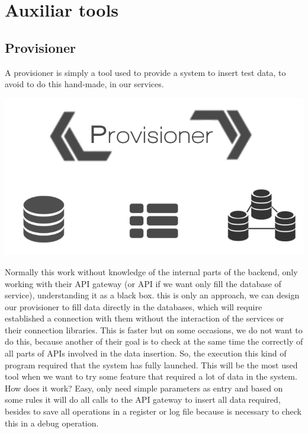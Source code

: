 \section{Auxiliar tools}


\subsection{Provisioner}
A provisioner is simply a tool used to provide a system to insert test data, to
avoid to do this hand-made, in our services.

\begin{center}
\includegraphics[scale=0.4]{img/graphics/provisioner.png}
\end{center}

\noindent Normally this work without knowledge
of the internal parts of the backend, only working with their API gateway (or
API if we want only fill the database of service), understanding it as a black box.
this is only an approach, we can design our provisioner to fill data directly
in the databases, which will require established a connection with them without
the interaction of the services or their connection libraries. This is faster but
on some occasions, we do not want to do this, because another of their goal is to
check at the same time the correctly of all parts of APIs involved in the data insertion.
\intro
So, the execution this kind of program required that the system has fully launched.
This will be the most used tool when we want to try some feature that required a
lot of data in the system.
\intro
How does it work? Easy, only need simple parameters as entry and based on some rules it will do all
calls to the API gateway to insert all data required, besides to save all operations
in a register or log file because is necessary to check this in a debug operation.
